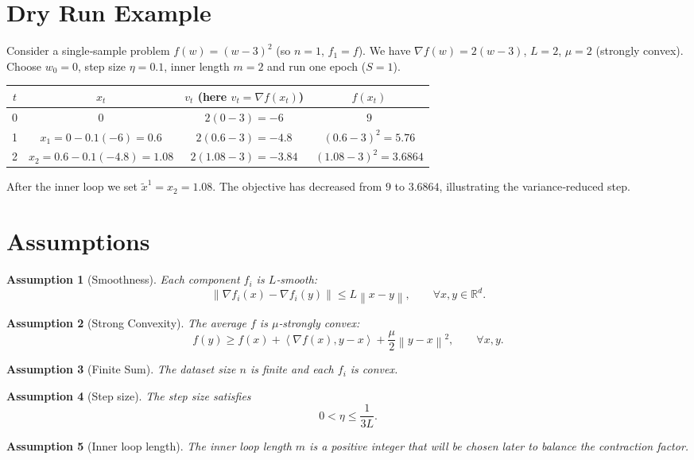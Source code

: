 \documentclass[11pt]{article}
\newtheorem{assumption}{Assumption}
\newcommand{\norm}[1]{\left\|#1\right\|}
\newcommand{\inner}[2]{\left\langle #1,#2\right\rangle}
\newcommand{\grad}{\nabla}
\begin{document}
\section*{Dry Run Example}
Consider a single‑sample problem $f(w)=(w-3)^2$ (so $n=1$, $f_1=f$).  
We have $\grad f(w)=2(w-3)$, $L=2$, $\mu=2$ (strongly convex).  
Choose $w_0=0$, step size $\eta=0.1$, inner length $m=2$ and run one epoch ($S=1$).

\begin{center}
\begin{tabular}{c|c|c|c}
$t$ & $x_t$ & $v_t$ (here $v_t=\grad f(x_t)$) & $f(x_t)$\\ \hline
0 & $0$ & $2(0-3)=-6$ & $9$\\
1 & $x_1=0-0.1(-6)=0.6$ & $2(0.6-3)=-4.8$ & $(0.6-3)^2=5.76$\\
2 & $x_2=0.6-0.1(-4.8)=1.08$ & $2(1.08-3)=-3.84$ & $(1.08-3)^2=3.6864$
\end{tabular}
\end{center}
After the inner loop we set $\tilde{x}^{1}=x_2=1.08$.  The objective has decreased from $9$ to $3.6864$, illustrating the variance‑reduced step.

\newpage
\section*{Assumptions}
\begin{assumption}[Smoothness]\label{ass:smooth}
Each component $f_i$ is $L$‑smooth:
\[
\norm{\grad f_i(x)-\grad f_i(y)}\le L\norm{x-y},\qquad\forall x,y\in\mathbb{R}^d .
\]
\end{assumption}
\begin{assumption}[Strong Convexity]\label{ass:strong}
The average $f$ is $\mu$‑strongly convex:
\[
f(y)\ge f(x)+\inner{\grad f(x)}{y-x}+\frac{\mu}{2}\norm{y-x}^2,
\qquad\forall x,y .
\]
\end{assumption}
\begin{assumption}[Finite Sum]\label{ass:finite}
The dataset size $n$ is finite and each $f_i$ is convex.
\end{assumption}
\begin{assumption}[Step size]\label{ass:step}
The step size satisfies
\[
0<\eta\le\frac{1}{3L}.
\]
\end{assumption}
\begin{assumption}[Inner loop length]\label{ass:m}
The inner loop length $m$ is a positive integer that will be chosen later to balance the contraction factor.
\end{assumption}
\end{document}
